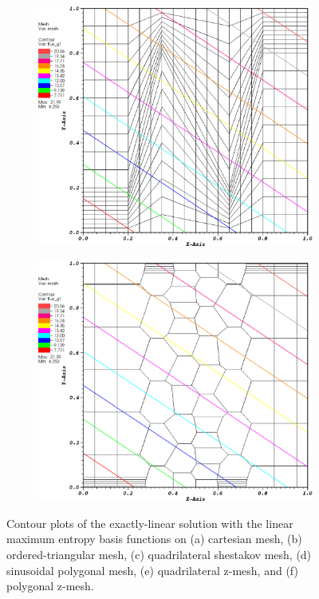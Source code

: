 \begin{figure}
\begin{subfigure}[b]{0.45\textwidth}
		\caption{}
	\end{subfigure}
	\vfill
	\begin{subfigure}[b]{0.45\textwidth}
		\centering
		\label{subfig::z_quad_me_k1_lin_sol}
		\includegraphics[width=\textwidth]{figures/sec_BF/z_quad_MAXENT_k1.eps}
		\caption{}
	\end{subfigure}
	\hfill
	\begin{subfigure}[b]{0.45\textwidth}
		\centering
		\label{subfig::z_poly_me_k1_lin_sol}
		\includegraphics[width=\textwidth]{figures/sec_BF/z_poly_MAXENT_k1.eps}
		\caption{}
	\end{subfigure}
\caption{Contour plots of the exactly-linear solution with the linear maximum entropy basis functions on (a) cartesian mesh, (b) ordered-triangular mesh, (c) quadrilateral shestakov mesh, (d) sinusoidal polygonal mesh, (e) quadrilateral z-mesh, and (f) polygonal z-mesh.}
\label{fig::BF_Results_Linear_me1_sol}
\end{figure}

